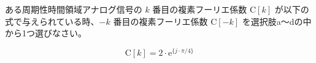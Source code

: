 ある周期性時間領域アナログ信号の $k$ 番目の複素フーリエ係数 $\textrm{C}[k]$ が以下の式で与えられている時、$-k$ 番目の複素フーリエ係数 $\textrm{C}[-k]$ を選択肢a〜dの中から1つ選びなさい。

\[
\textrm{C}[k] = 2 \cdot \textrm{e}^{\{j \cdot \pi/4 \}}
\]
